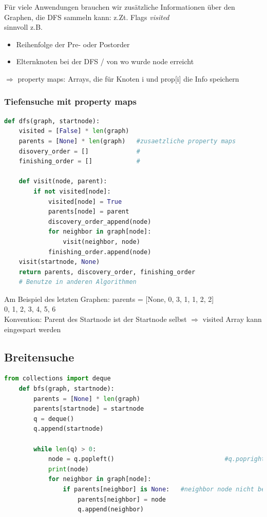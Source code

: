 \documentclass[11pt, fleqn]{scrreprt}
\begin{document}
	Für viele Anwendungen brauchen wir zusätzliche Informationen über den Graphen, die DFS sammeln kann: z.Zt. Flags \emph{visited} \\
	sinnvoll z.B. 
	\begin{itemize}
		\item Reihenfolge der Pre- oder Postorder
		\item Elternknoten bei der DFS / von wo wurde node erreicht
	\end{itemize}
	$\Rightarrow$ property maps: Arrays, die für Knoten i und prop[i] die Info speichern
	
	\subsubsection*{Tiefensuche mit property maps}
	\begin{lstlisting}[language=Python]
def dfs(graph, startnode):
	visited = [False] * len(graph)
	parents = [None] * len(graph)   #zusaetzliche property maps
	disovery_order = []             #
	finishing_order = []            #

	def visit(node, parent):
		if not visited[node]:
			visited[node] = True
			parents[node] = parent
			discovery_order_append(node)
			for neighbor in graph[node]:
				visit(neighbor, node)
			finishing_order.append(node)
	visit(startnode, None)
	return parents, discovery_order, finishing_order
	# Benutze in anderen Algorithmen
	\end{lstlisting}
	
	Am Beispiel des letzten Graphen:
	parents = [None, 0, 3, 1, 1, 2, 2]\\
	\hspace*{8.3cm} 0, 1, 2, 3, 4, 5, 6\\
	
	Konvention: Parent des Startnode ist der Startnode selbst $\Rightarrow$ visited Array kann eingespart werden\\
	
	
	\subsection*{Breitensuche}
	\begin{lstlisting}[language=Python]
	from collections import deque
	def bfs(graph, startnode):
		parents = [None] * len(graph)
		parents[startnode] = startnode
		q = deque()
		q.append(startnode)
	
		while len(q) > 0:
			node = q.popleft()  							#q.popright() => Tiefensuche
			print(node)
			for neighbor in graph[node]:
				if parents[neighbor] is None:   #neighbor node nicht besucht
					parents[neighbor] = node
					q.append(neighbor)
	\end{lstlisting}
	
\end{document}
